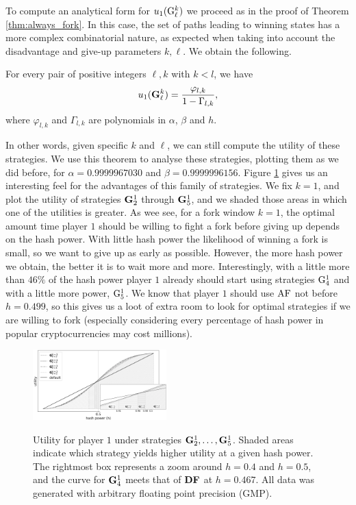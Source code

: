 To compute an analytical form for $u_1({\rm {G}}_\ell^k)$ we proceed as in the proof of Theorem \ref{thm:always_fork}. In this case, the set of paths leading to winning states has a more complex combinatorial nature, as expected when taking into account the disadvantage and give-up parameters $k,\ell$. We obtain the following.

\begin{theorem}
For every pair of positive integers $\ell, k$ with $k<l$, we have 
$$u_1({\rm {\bf G}}^k_\ell) = \frac{\varphi_{\tiny l,k}}{1-\Gamma_{l,k}},$$
where $\varphi_{l,k}$ and $\Gamma_{l,k}$ are polynomials in $\alpha$, $\beta$ and $h$. 
\end{theorem}

In other words, given specific $k$ and $\ell$, we can still compute the utility of these strategies. We use this theorem to analyse these strategies, plotting them as we did before, 
for $\alpha = 0.9999967030$ and $\beta = 0.9999996156$. Figure \ref{fig-plot-gup-fixwindow} gives us an interesting feel for the advantages of this family of strategies. 
We fix $k = 1$, and plot the utility of strategies ${\rm {\bf G}}^1_2$ through ${\rm {\bf G}}^1_5$, and we shaded those areas in which one of the utilities is greater. As wee see, for a 
fork window $k = 1$, the optimal amount time player $1$ should be willing to fight a fork before giving up depends on the hash power. With little hash power the likelihood of winning a 
fork is small, so we want to give up as early as possible. However, the more hash power we obtain, the better it is to wait more and more. Interestingly, with a little more than 
$46\%$ of the hash power player $1$ already should start using strategies ${\rm {G}}^1_4$ and with a little more power, ${\rm {G}}^1_5$. We know that player $1$ should use $\text{\rm AF}$ not before 
$h = 0.499$, so this gives us a loot of extra room to look for optimal strategies if we are willing to fork (especially considering every percentage of hash power in popular cryptocurrencies 
may cost millions).

\begin{figure}
  \centering
    \includegraphics[width=0.46\textwidth]{plots/GUP.png}
    \label{fig-plot-gup-fixwindow}
    \caption{Utility for player $1$ under strategies ${\rm {\bf G}}^1_2, \dots, {\rm {\bf G}}^1_5$. Shaded areas indicate which strategy yields higher utility at a given hash power. 
    The rightmost box represents a zoom around $h = 0.4$ and $h = 0.5$, and the curve for ${\rm {\bf G}}^1_4$ meets that of $\text{\rm {\bf DF}}$ at $h = 0.467$. All data was generated with arbitrary floating point precision (GMP).}
\end{figure}

